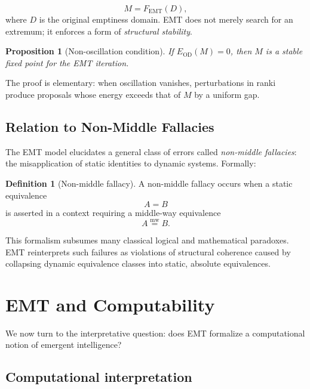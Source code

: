 \documentclass[11pt]{article}
\newcommand{\mweq}{\mathrel{\overset{\mathrm{mw}}{=}}}
\newtheorem{proposition}[theorem]{Proposition}
\theoremstyle{definition}
\newtheorem{definition}[theorem]{Definition}
\theoremstyle{remark}
\begin{document}
\[
   M = F_{\mathrm{EMT}}(D),
\]
where $D$ is the original emptiness domain. EMT does not merely search
for an extremum; it enforces a form of \emph{structural stability}.

\begin{proposition}[Non-oscillation condition]
If $E_{\mathrm{OD}}(M)=0$, then $M$ is a stable fixed point for the
EMT iteration.
\end{proposition}

The proof is elementary: when oscillation vanishes, perturbations in
ranki produce proposals whose energy exceeds that of $M$ by a uniform
gap.


\subsection{Relation to Non-Middle Fallacies}

The EMT model elucidates a general class of errors called
\emph{non-middle fallacies}: the misapplication of static identities
to dynamic systems. Formally:

\begin{definition}[Non-middle fallacy]
A non-middle fallacy occurs when a static equivalence
\[
   A = B
\]
is asserted in a context requiring a middle-way equivalence
\[
   A \mweq B.
\]
\end{definition}

This formalism subsumes many classical logical and mathematical
paradoxes. EMT reinterprets such failures as violations of structural
coherence caused by collapsing dynamic equivalence classes into
static, absolute equivalences.


\section{EMT and Computability}

We now turn to the interpretative question: does EMT formalize a
computational notion of emergent intelligence?

\subsection{Computational interpretation}
\end{document}
